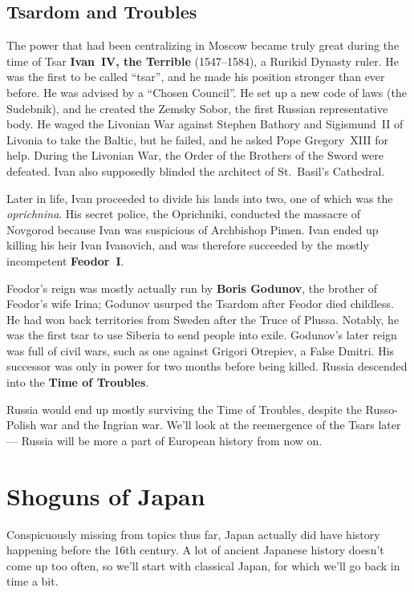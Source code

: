 \subsection*{Tsardom and Troubles}

The power that had been centralizing in Moscow became truly great during the time of
Tsar \textbf{Ivan~IV, the Terrible} (1547--1584), a Rurikid Dynasty ruler.
He was the first to be called ``tsar'', and he made his position stronger than ever before.
He was advised by a ``Chosen Council''.
He set up a new code of laws (the Sudebnik), and he created the Zemsky Sobor, the first Russian representative body.
He waged the Livonian War against Stephen Bathory and Sigismund~II of Livonia to take the Baltic,
but he failed, and he asked Pope Gregory~XIII for help.
During the Livonian War, the Order of the Brothers of the Sword were defeated.
Ivan also supposedly blinded the architect of St.\ Basil's Cathedral.

Later in life, Ivan proceeded to divide his lands into two, one of which was the \textit{oprichnina}.
His secret police, the Oprichniki, conducted the massacre of Novgorod because Ivan was suspicious of Archbishop Pimen.
Ivan ended up killing his heir Ivan Ivanovich,
and was therefore succeeded by the mostly incompetent \textbf{Feodor~I}.

Feodor's reign was mostly actually run by \textbf{Boris Godunov}, the brother of Feodor's wife Irina;
Godunov usurped the Tsardom after Feodor died childless.
He had won back territories from Sweden after the Truce of Plussa.
Notably, he was the first tsar to use Siberia to send people into exile.
Godunov's later reign was full of civil wars, such as one against Grigori Otrepiev, a False Dmitri.
His successor was only in power for two months before being killed.
Russia descended into the \textbf{Time of Troubles}.

Russia would end up mostly surviving the Time of Troubles, despite the Russo-Polish war and the Ingrian war.
We'll look at the reemergence of the Tsars later --- Russia will be more a part of European history from now on.

\section{Shoguns of Japan}

Conspicuously missing from topics thus far,
Japan actually did have history happening before the 16th century.
A lot of ancient Japanese history doesn't come up too often,
so we'll start with classical Japan, for which we'll go back in time a bit.

